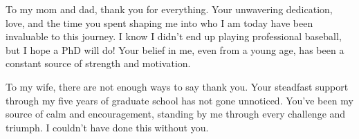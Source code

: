 To my mom and dad, thank you for everything. Your unwavering dedication, love, and the time you spent shaping me into who I am today have been invaluable to this journey. I know I didn’t end up playing professional baseball, but I hope a PhD will do! Your belief in me, even from a young age, has been a constant source of strength and motivation.

To my wife, there are not enough ways to say thank you. Your steadfast support through my five years of graduate school has not gone unnoticed. You’ve been my source of calm and encouragement, standing by me through every challenge and triumph. I couldn’t have done this without you.